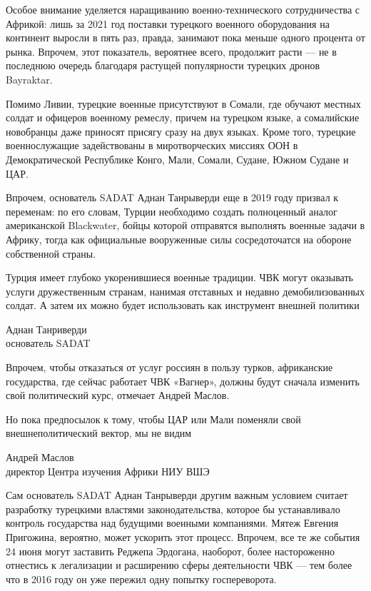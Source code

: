 Особое внимание уделяется наращиванию военно-технического сотрудничества с Африкой: лишь за 2021 год поставки турецкого военного оборудования на континент выросли в пять раз, правда, занимают пока меньше одного процента от рынка. Впрочем, этот показатель, вероятнее всего, продолжит расти — не в последнюю очередь благодаря растущей популярности турецких дронов Bayraktar.

Помимо Ливии, турецкие военные присутствуют в Сомали, где обучают местных солдат и офицеров военному ремеслу, причем на турецком языке, а сомалийские новобранцы даже приносят присягу сразу на двух языках. Кроме того, турецкие военнослужащие задействованы в миротворческих миссиях ООН в Демократической Республике Конго, Мали, Сомали, Судане, Южном Судане и ЦАР.

Впрочем, основатель SADAT Аднан Танрыверди еще в 2019 году призвал к переменам: по его словам, Турции необходимо создать полноценный аналог американской Blackwater, бойцы которой отправятся выполнять военные задачи в Африку, тогда как официальные вооруженные силы сосредоточатся на обороне собственной страны.

\begin{fancyquotes}
    Турция имеет глубоко укоренившиеся военные традиции. ЧВК могут оказывать услуги дружественным странам, нанимая отставных и недавно демобилизованных солдат. А затем их можно будет использовать как инструмент внешней политики

    \begin{flushright}
        Аднан Танриверди\\
        основатель SADAT
    \end{flushright}
\end{fancyquotes}

Впрочем, чтобы отказаться от услуг россиян в пользу турков, африканские государства, где сейчас работает ЧВК «Вагнер», должны будут сначала изменить свой политический курс, отмечает Андрей Маслов.

\begin{fancyquotes}
    Но пока предпосылок к тому, чтобы ЦАР или Мали поменяли свой внешнеполитический вектор, мы не видим

    \begin{flushright}
        Андрей Маслов\\
        директор Центра изучения Африки НИУ ВШЭ
    \end{flushright}
\end{fancyquotes}

Сам основатель SADAT Аднан Танрыверди другим важным условием считает разработку турецкими властями законодательства, которое бы устанавливало контроль государства над будущими военными компаниями. Мятеж Евгения Пригожина, вероятно, может ускорить этот процесс. Впрочем, все те же события 24 июня могут заставить Реджепа Эрдогана, наоборот, более настороженно отнестись к легализации и расширению сферы деятельности ЧВК — тем более что в 2016 году он уже пережил одну попытку госпереворота.

